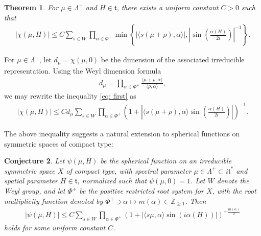 \documentclass{amsart}
\numberwithin{equation}{section}
\newtheorem{thm}{Theorem}[section]
\newtheorem{conj}[thm]{Conjecture}
\numberwithin{equation}{section}
\begin{document}


\begin{thm}\label{thm: main}
For $\mu\in\Lambda^+$ and $H\in\mathfrak{t}$, there exists a uniform constant $C>0$ such that  
\begin{align}\label{eq: first}
    |\chi(\mu, H)|\leq C\sum_{s\in W}\prod_{\alpha\in\Phi^+}\min\left\{|\langle s(\mu+\rho),\alpha\rangle|, \left|\sin\left(\frac{\alpha( H)}{2 i}\right)\right|^{-1}\right\}.
\end{align}
\end{thm}


For $\mu\in\Lambda^+$, let $d_\mu=\chi(\mu,0)$ be the dimension of the associated irreducible representation. Using the Weyl dimension formula \cite{Wey39} 
\begin{align}\label{eq: dimension}
d_\mu=\prod_{\alpha\in\Phi^+}\frac{\langle  \mu+\rho,\alpha\rangle}{\langle  \rho,\alpha\rangle},
\end{align}
we may rewrite the inequality \eqref{eq: first} as 
\begin{align}\label{eq: second}
    |\chi(\mu, H)|\leq C d_\mu\sum_{s\in W}\prod_{\alpha\in\Phi^+}\left(1+ \left|\langle s(\mu+\rho),\alpha\rangle\sin\left(\frac{\alpha( H)}{2 i}\right)\right|\right)^{-1}.
\end{align}

The above inequality suggests a natural extension to spherical functions on symmetric spaces of compact type: 

\begin{conj}\label{conj}
Let $\psi(\mu,H)$ be the spherical function on an irreducible symmetric space $X$ of compact type, with spectral parameter $\mu\in \Lambda^+\subset i\mathfrak{t}^*$ and spatial parameter $H\in \mathfrak{t}$, normalized such that $\psi(\mu,0)=1$. 
Let $W$ denote the Weyl group, and let $\Phi^+$ be the positive restricted root system for $X$, with the root multiplicity function denoted by $\Phi^+\ni\alpha\mapsto m(\alpha)\in\mathbb{Z}_{\geq 1}$.  %
Then 
\begin{align} \label{eq: conj}
    |\psi(\mu, H)|\leq C\sum_{s\in W}\prod_{\alpha\in\Phi^+}\left(1+ \left|\langle s\mu,\alpha\rangle\sin\left(i\alpha( H)\right)\right|\right)^{-\frac{m(\alpha)}{2}}
\end{align}
holds for some uniform constant $C$. 
\end{conj}
\end{document}
